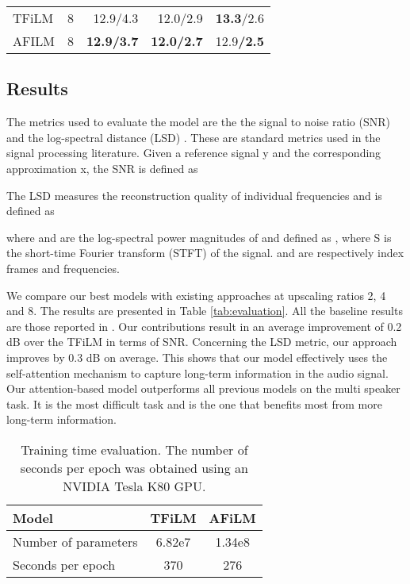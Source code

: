 \documentclass{article}
\begin{document}
\begin{table}[h]
\begin{tabular}{|l|r|r|r|r|}
    TFiLM \cite{birnbaum2019temporal} & 8                          & 12.9/4.3                                                                     & 12.0/2.9                                                                    & \textbf{13.3}/2.6                   \\
    AFILM   & 8                          & \textbf{12.9/3.7}                                                                          & \textbf{12.0/2.7}                                                                         & 12.9\textbf{/2.5}                        \\ \hline
    \end{tabular}
\end{table}

\subsection{Results}
The metrics used to evaluate the model are the the signal to noise ratio (SNR) and the log-spectral distance (LSD) \cite{gray1976distance}. These are standard metrics used in the signal processing literature. Given a reference signal y and the corresponding approximation x, the SNR is
defined as

The LSD measures the reconstruction quality of individual
frequencies and is defined as

where  and  are the log-spectral power magnitudes of  and  defined as , where S is the short-time Fourier transform (STFT) of the signal.  and  are respectively index frames and frequencies.

We compare our best models with existing approaches at upscaling ratios 2, 4 and 8. The results are presented in Table \ref{tab:evaluation}. All the baseline results are those reported in \cite{birnbaum2019temporal}. Our contributions result in an average improvement of 0.2 dB over the TFiLM in terms of SNR. Concerning the LSD metric, our approach improves by 0.3 dB on average. This shows that our model effectively uses the self-attention mechanism to capture long-term information in the audio signal. Our attention-based model outperforms all previous models on the multi speaker task. It is the most difficult task and is the one that benefits most from more long-term information.

\begin{table}[]
\centering
\caption{Training time evaluation. The number of seconds per epoch was obtained using an NVIDIA Tesla K80 GPU.}
\label{tab:computational_per}
\begin{tabular}{|l|c|c|}
\hline
Model                & TFiLM  & AFiLM  \\ \hline
Number of parameters & 6.82e7 & 1.34e8 \\ \hline
Seconds per epoch    & 370    & 276    \\ \hline
\end{tabular}
\end{table}
\end{document}
